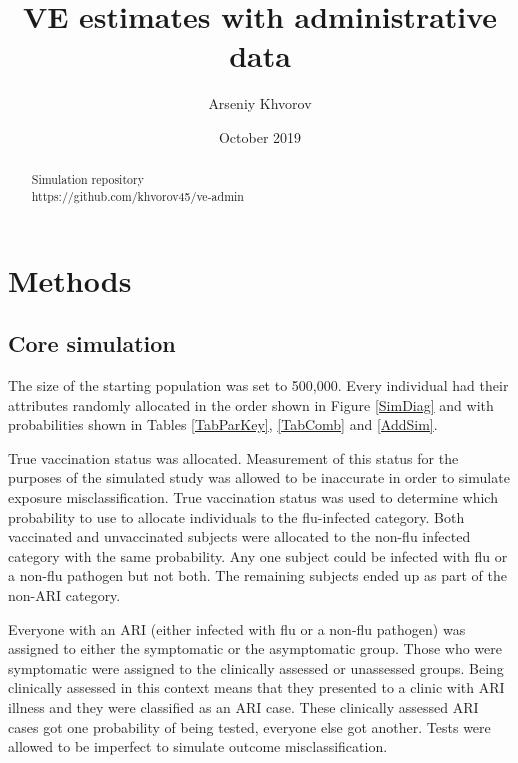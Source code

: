 \documentclass[11pt]{article}
\title{VE estimates with administrative data}
\author{Arseniy Khvorov}
\date{October 2019}
\begin{document}
\maketitle

\renewcommand{\abstractname}{}
\begin{abstract}
	\begin{center}
	Simulation repository\\
	https://github.com/khvorov45/ve-admin
	\end{center}
\end{abstract}

\tableofcontents

\pagebreak

%
\section{Methods}

\subsection{Core simulation}

The size of the starting population was set to 500,000. Every individual had their attributes randomly allocated in the order shown in Figure \ref{SimDiag} and with probabilities shown in Tables \ref{TabParKey}, \ref{TabComb} and \ref{AddSim}.

True vaccination status was allocated. Measurement of this status for the purposes of the simulated study was allowed to be inaccurate in order to simulate exposure misclassification. True vaccination status was used to determine which probability to use to allocate individuals to the flu-infected category. Both vaccinated and unvaccinated subjects were allocated to the non-flu infected category with the same probability. Any one subject could be infected with flu or a non-flu pathogen but not both. The remaining subjects ended up as part of the non-ARI category.

Everyone with an ARI (either infected with flu or a non-flu pathogen) was assigned to either the symptomatic or the asymptomatic group. Those who were symptomatic were assigned to the clinically assessed or unassessed groups. Being clinically assessed in this context means that they presented to a clinic with ARI illness and they were classified as an ARI case. These clinically assessed ARI cases got one probability of being tested, everyone else got another. Tests were allowed to be imperfect to simulate outcome misclassification.
\end{document}

